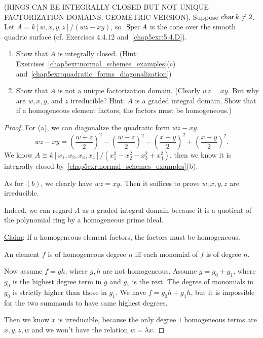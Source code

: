 \begin{exr}
(RINGS CAN BE INTEGRALLY CLOSED BUT NOT UNIQUE FACTORIZATION DOMAINS, GEOMETRIC VERSION). Suppose $\text{char\,} k \neq 2$. Let $A = k[w, x, y, z]/(wz - xy)$, so $\text{ Spec\,} A$ is the cone over the smooth quadric surface (cf. Exercises 4.4.12 and~\ref{chap5exr:5.4.D}).
\begin{enumerate}[label=(\alph*)]
\item Show that $A$ is integrally closed. (Hint: Exercises~\ref{chap5exr:normal_schemes_examples}(c) and~\ref{chap5exr:quadratic_forms_diagonalization})
\item Show that $A$ is not a unique factorization domain. (Clearly $wz = xy$. But why are $w, x, y$, and $z$ irreducible? Hint: $A$ is a graded integral domain. Show that if a homogeneous element factors, the factors must be homogeneous.)
\end{enumerate}
\end{exr}
\begin{proof}
For (a), we can diagonalize the quadratic form $wz-xy$.
$$
wz-xy=\left(\frac{w+z}{2}\right)^2-\left(\frac{w-z}{2}\right)^2-\left(\frac{x+y}{2}\right)^2+\left(\frac{x-y}{2}\right)^2.
$$
We know $A\cong k[x_1,x_2,x_3,x_4]/(x_1^2-x_2^2-x_3^2+x_4^2)$, then we know it is integrally closed by~\ref{chap5exr:normal_schemes_examples}(b).

As for $(b)$, we clearly have $wz=xy$. Then it suffices to prove $w,x,y,z$ are irreducible.  

Indeed, we can regard $A$ as a graded integral domain because it is a quotient of the polynomial ring by a homogeneous prime ideal. 

\underline{Claim}: If a homogeneous element factors, the factors must be homogeneous. 

An element $f$ is of homogeneous degree $n$ iff each monomial of $f$ is of degree $n$.

Now assume $f=gh$, where $g,h$ are not homogeneous. Assume $g=g_{0}+g_1$, where $g_0$ is the highest degree term in $g$ and $g_1$ is the rest. The degree of monomials in $g_0$ is strictly higher than those in $g_1$. We have $f=g_0 h+g_1 h$, but it is impossible for the two summands to have same highest degrees.

Then we know $x$ is irreducible, because the only degree 
$1$ homogeneous terms are $x,y,z,w$ and we won't have the relation $w=\lambda x$. 
\end{proof}

